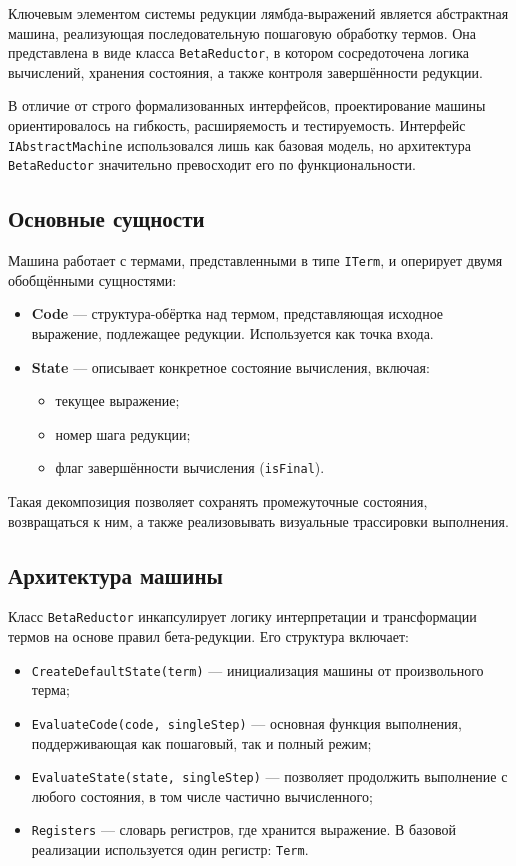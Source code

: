 Ключевым элементом системы редукции лямбда‑выражений является абстрактная машина, реализующая последовательную пошаговую обработку термов. Она представлена в виде класса \texttt{BetaReductor}, в котором сосредоточена логика вычислений, хранения состояния, а также контроля завершённости редукции.

В отличие от строго формализованных интерфейсов, проектирование машины ориентировалось на гибкость, расширяемость и тестируемость. Интерфейс \texttt{IAbstractMachine} использовался лишь как базовая модель, но архитектура \texttt{BetaReductor} значительно превосходит его по функциональности.

\subsection{Основные сущности}

Машина работает с термами, представленными в типе \texttt{ITerm}, и оперирует двумя обобщёнными сущностями:

\begin{itemize}
  \item \textbf{Code} — структура-обёртка над термом, представляющая исходное выражение, подлежащее редукции. Используется как точка входа.
  \item \textbf{State} — описывает конкретное состояние вычисления, включая:
    \begin{itemize}
      \item текущее выражение;
      \item номер шага редукции;
      \item флаг завершённости вычисления (\texttt{isFinal}).
    \end{itemize}
\end{itemize}

Такая декомпозиция позволяет сохранять промежуточные состояния, возвращаться к ним, а также реализовывать визуальные трассировки выполнения.

\subsection{Архитектура машины}

Класс \texttt{BetaReductor} инкапсулирует логику интерпретации и трансформации термов на основе правил бета-редукции. Его структура включает:

\begin{itemize}
  \item \texttt{CreateDefaultState(term)} — инициализация машины от произвольного терма;
  \item \texttt{EvaluateCode(code, singleStep)} — основная функция выполнения, поддерживающая как пошаговый, так и полный режим;
  \item \texttt{EvaluateState(state, singleStep)} — позволяет продолжить выполнение с любого состояния, в том числе частично вычисленного;
  \item \texttt{Registers} — словарь регистров, где хранится выражение. В базовой реализации используется один регистр: \texttt{Term}.
\end{itemize}


